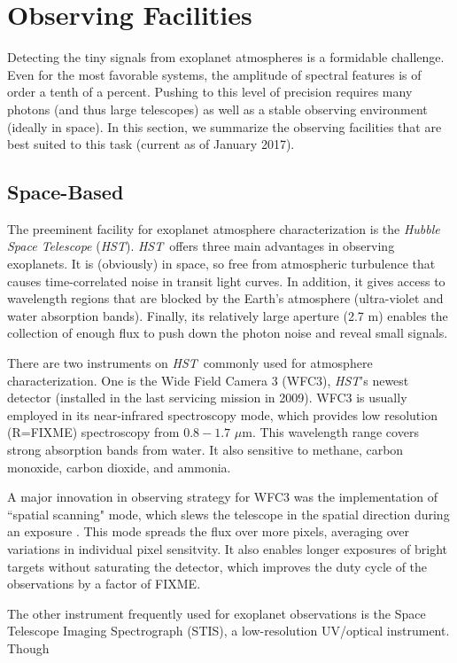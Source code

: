 \documentclass[graybox,natbib,nosecnum]{svmult}
\newcommand{\project}[1]{\textsl{#1}}
\newcommand{\HST}{\project{HST}}
\begin{document}
\section{Observing Facilities}
Detecting the tiny signals from exoplanet atmospheres is a formidable challenge. Even for the most favorable systems, the amplitude of spectral features is of order a tenth of a percent. Pushing to this level of precision requires many photons (and thus large telescopes) as well as a stable observing environment (ideally in space).  In this section, we summarize the observing facilities that are best suited to this task (current as of January 2017).

\subsection{Space-Based}
The preeminent facility for exoplanet atmosphere characterization is the \emph{Hubble Space Telescope} (\HST).
\HST\ offers three main advantages in observing exoplanets. It is (obviously) in space, so free from atmospheric turbulence that causes time-correlated noise in transit light curves. In addition, it gives access to wavelength regions that are blocked by the Earth's atmosphere (ultra-violet and water absorption bands).  Finally, its relatively large aperture (2.7 m) enables the collection of enough flux to push down the photon noise and reveal small signals.

There are two instruments on \HST\ commonly used for atmosphere characterization. One is the Wide Field Camera 3 (WFC3), \HST's newest detector (installed in the last servicing mission in 2009). WFC3 is usually employed in its near-infrared spectroscopy mode, which provides low resolution (R=FIXME) spectroscopy from $0.8 - 1.7$ $\mu$m. This wavelength range covers strong absorption bands from water. It also sensitive to methane, carbon monoxide, carbon dioxide, and ammonia.

A major innovation in observing strategy for WFC3 was the implementation of ``spatial scanning" mode, which slews the telescope in the spatial direction during an exposure \citep[first used by][]{deming13}. This mode spreads the flux over more pixels, averaging over variations in individual pixel sensitvity. It also enables longer exposures of bright targets without saturating the detector, which improves the duty cycle of the observations by a factor of FIXME.

The other instrument frequently used for exoplanet observations is the Space Telescope Imaging Spectrograph (STIS), a low-resolution UV/optical instrument. Though  
\end{document}
